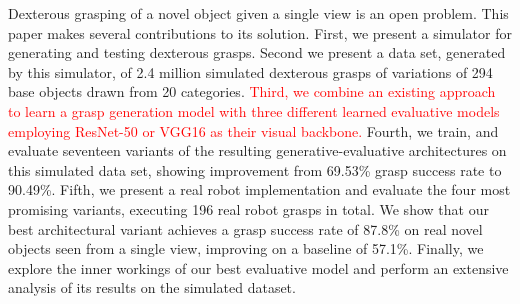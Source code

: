 Dexterous grasping of a novel object given a single view is an open problem. This paper makes several contributions to its solution. First, we present a simulator for generating and testing dexterous grasps. Second we present a data set, generated by  this simulator, of 2.4 million simulated dexterous grasps of variations of 294 base objects drawn from 20 categories. \textcolor{red}{Third, we combine an existing approach to learn a grasp generation model with three different learned evaluative models employing ResNet-50 or VGG16 as their visual backbone.} Fourth, we train, and evaluate seventeen variants of the resulting generative-evaluative architectures on this simulated data set, showing improvement from 69.53\% grasp success rate to 90.49\%. Fifth, we present a real robot implementation and evaluate the four most promising variants, executing 196 real robot grasps in total. We show that our best architectural variant achieves a grasp success rate of 87.8\% on real novel objects seen from a single view, improving on a baseline of 57.1\%. Finally, we explore the inner workings of our best evaluative model and perform an extensive analysis of its results on the simulated dataset. 



